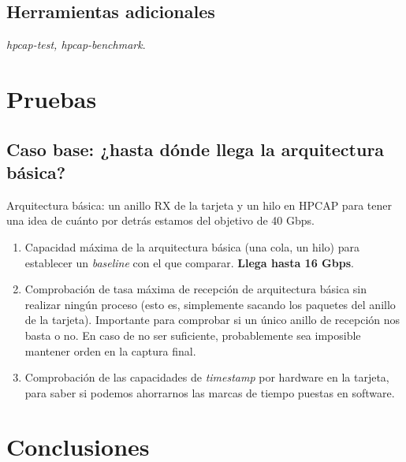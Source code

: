 \documentclass[oneside, draft]{epstfg}
\begin{document}
\section{Herramientas adicionales}

\textit{hpcap-test, hpcap-benchmark}.

\chapter{Pruebas}

\section{Caso base: ¿hasta dónde llega la arquitectura básica?}

Arquitectura básica: un anillo RX de la tarjeta y un hilo en HPCAP para tener una idea de cuánto por detrás estamos del objetivo de 40 Gbps.

\begin{enumerate}
\item Capacidad máxima de la arquitectura básica (una cola, un hilo) para establecer un \textit{baseline} con el que comparar. \textbf{Llega hasta 16 Gbps}.
\item Comprobación de tasa máxima de recepción de arquitectura básica sin realizar ningún proceso (esto es, simplemente sacando los paquetes del anillo de la tarjeta). Importante para comprobar si un único anillo de recepción nos basta o no. En caso de no ser suficiente, probablemente sea imposible mantener orden en la captura final.
\item Comprobación de las capacidades de \textit{timestamp} por hardware en la tarjeta, para saber si podemos ahorrarnos las marcas de tiempo puestas en software.
\end{enumerate}


\chapter{Conclusiones}

\appendix

\printnoidxglossaries
\cleardoublepage

\nocite{*}
{}

\cleardoublepage
\printindex
\end{document}
